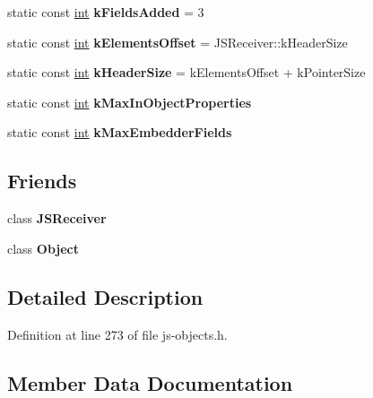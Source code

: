 \begin{DoxyCompactItemize}
static const \mbox{\hyperlink{classint}{int}} {\bfseries k\+Fields\+Added} = 3
\item 
\mbox{\label{classv8_1_1internal_1_1JSObject_adbdc81f5aec6d4defbcc3099b17f5142}} 
static const \mbox{\hyperlink{classint}{int}} {\bfseries k\+Elements\+Offset} = J\+S\+Receiver\+::k\+Header\+Size
\item 
\mbox{\label{classv8_1_1internal_1_1JSObject_a5ba6da4d81bc33d61cafa6a5b3f1e619}} 
static const \mbox{\hyperlink{classint}{int}} {\bfseries k\+Header\+Size} = k\+Elements\+Offset + k\+Pointer\+Size
\item 
static const \mbox{\hyperlink{classint}{int}} {\bfseries k\+Max\+In\+Object\+Properties}
\item 
static const \mbox{\hyperlink{classint}{int}} {\bfseries k\+Max\+Embedder\+Fields}
\end{DoxyCompactItemize}
\subsection*{Friends}
\begin{DoxyCompactItemize}
\item 
\mbox{\label{classv8_1_1internal_1_1JSObject_a52a8ab6293af62038e1f16e7f27701f2}} 
class {\bfseries J\+S\+Receiver}
\item 
\mbox{\label{classv8_1_1internal_1_1JSObject_a0720b5f434e636e22a3ed34f847eec57}} 
class {\bfseries Object}
\end{DoxyCompactItemize}


\subsection{Detailed Description}


Definition at line 273 of file js-\/objects.\+h.



\subsection{Member Data Documentation}
\mbox{\label{classv8_1_1internal_1_1JSObject_a9737d12d68094880b12f3bd36143915d}} 
